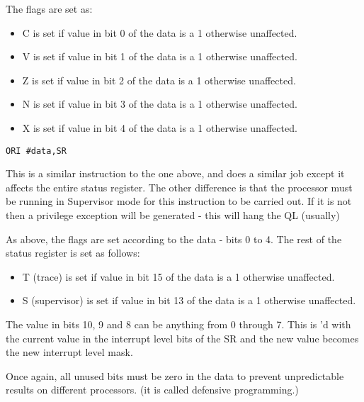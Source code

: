 The flags are set as:
\begin{itemize}[itemsep=0pt]

\item{}C is set if value in bit 0 of the data is a 1 otherwise
        unaffected.


\item{}V is set if value in bit 1 of the data is a 1 otherwise
        unaffected.


\item{}Z is set if value in bit 2 of the data is a 1 otherwise
        unaffected.


\item{}N is set if value in bit 3 of the data is a 1 otherwise
        unaffected.


\item{}X is set if value in bit 4 of the data is a 1 otherwise
        unaffected.

\end{itemize}

\begin{lstlisting}[firstnumber=1,]
          ORI #data,SR 
\end{lstlisting}

This is a similar instruction to the one above, and does a similar
    job except it affects the entire status register. The other difference is
    that the processor must be running in Supervisor mode for this instruction
    to be carried out. If it is not then a privilege exception will be
    generated -{} this will hang the QL (usually)

As above, the flags are set according to the data -{} bits 0 to 4. The
    rest of the status register is set as follows:
\begin{itemize}[itemsep=0pt]

\item{}T (trace) is set if value in bit 15 of the data is a 1 otherwise
        unaffected.


\item{}S (supervisor) is set if value in bit 13 of the data is a 1
        otherwise unaffected.

\end{itemize}

The value in bits 10, 9 and 8 can be anything from 0 through 7. This
    is 'd with the current value in the interrupt level bits of the SR and
    the new value becomes the new interrupt level mask.

Once again, all unused bits must be zero in the data to prevent
    unpredictable results on different processors. (it is called defensive
    programming.)

